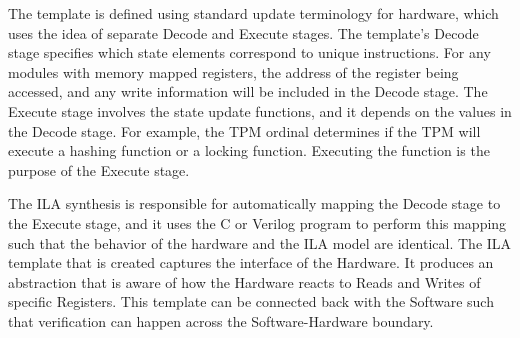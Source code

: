 The template is defined using standard update terminology for hardware, which
uses the idea of separate Decode and Execute stages.
The template's Decode stage specifies which state elements correspond to unique
instructions.
For any modules with memory mapped registers, the address of the register being
accessed, and any write information will be included in the Decode stage. 
The Execute stage involves the state update functions, and it depends on the
values in the Decode stage.
For example, the TPM ordinal determines if the TPM will execute a hashing
function or a locking function.
Executing the function is the purpose of the Execute stage.

The ILA synthesis is responsible for automatically mapping the Decode stage to
the Execute stage, and it uses the C or Verilog program to perform this mapping
such that the behavior of the hardware and the ILA model are identical.
The ILA template that is created captures the interface of the Hardware.
It produces an abstraction that is aware of how the Hardware reacts to Reads and
Writes of specific Registers.
This template can be connected back with the Software such that verification can
happen across the Software-Hardware boundary.
